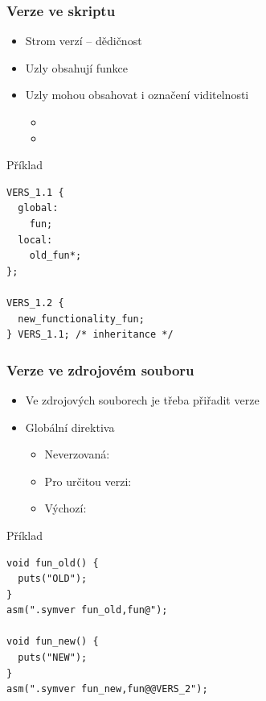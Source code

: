 \begin{frame}[fragile]
  \frametitle{Verze ve skriptu}

  \begin{itemize}
    \item Strom verzí -- dědičnost
    \item Uzly obsahují funkce
    \item Uzly mohou obsahovat i označení viditelnosti
    \begin{itemize}
      \item {}
      \item {}
    \end{itemize}
  \end{itemize}

  \pause

  \begin{block}{Příklad}
    \begin{lstlisting}[aboveskip=2pt,belowskip=2pt]
VERS_1.1 {
  global:
    fun;
  local:
    old_fun*;
};

VERS_1.2 {
  new_functionality_fun;
} VERS_1.1; /* inheritance */
    \end{lstlisting}
  \end{block}

\end{frame}

\begin{frame}[fragile]
  \frametitle{Verze ve zdrojovém souboru}

  \begin{itemize}
    \item Ve zdrojových souborech je třeba přiřadit verze
    \item Globální  direktiva
    \begin{itemize}
      \item Neverzovaná: 
      \item Pro určitou verzi: 
      \item Výchozí: 
    \end{itemize}
  \end{itemize}

  \begin{block}{Příklad}
  \begin{lstlisting}
void fun_old() {
  puts("OLD");
}
asm(".symver fun_old,fun@");

void fun_new() {
  puts("NEW");
}
asm(".symver fun_new,fun@@VERS_2");
  \end{lstlisting}
  \end{block}

\end{frame}

